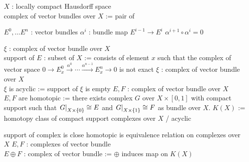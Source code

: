 \begin{Definition}[ベクトル束の複体]
\itemdefi
  \For \(X\) : locally compact Hausdorff space \\
  \Define complex of vector bundles over \(X\) := pair of
  \begin{itemize}
    \itemenum \(E^0 , \ldots E^n\) : vector bundles
    \itemenum \(\alpha^i\) : bundle map \(E^{i-1} \to E^{i}\)
    \itemwith \(\alpha^{i+1} \circ \alpha^i = 0\)
  \end{itemize}
\itemdefi
  \For \(\xi\) : complex of vector bundle over \(X\) \\
  \Define support of \(E\) : subset of \(X\) := consists of element \(x\) such that the complex of vector space \(0 \to E^0_x \overset{\alpha^0}{\to} \cdots \overset{\alpha^{n-1}}{\to} E^n_x \to 0\) is not exact
\itemdefi
  \For \(\xi\) : complex of vector bundle over \(X\) \\
  \Define \(\xi\) is acyclic := support of \(\xi\) is empty
\itemdefi
  \For \(E,F\) : complex of vector bundle over \(X\) \\
  \Define \(E,F\) are homotopic := there exists complex \(G\) over \(X \times [0,1]\) with compact support such that \(\left. {G} \right| _{X \times \{0\}} \cong E\) and \(\left. {G} \right| _{X \times \{1\}} \cong F\) as bundle over \(X\).
\itemdefi
  \Define \(K(X)\) := homotopy class of compact support complexes over \(X\) / acyclic
\end{Definition}

\begin{Theorem}
\itemprop
  \Then support of complex is close
\itemprop
  \Then homotopic is equivalence relation on complexes over \(X\)
\itemdefi
  \For \(E,F\) : complexes of vector bundle \\
  \Define \(E \oplus F\) : complex of vector bundle := 
\itemprop
  \Then \(\oplus\) induces map on \(K(X)\)
\end{Theorem}

